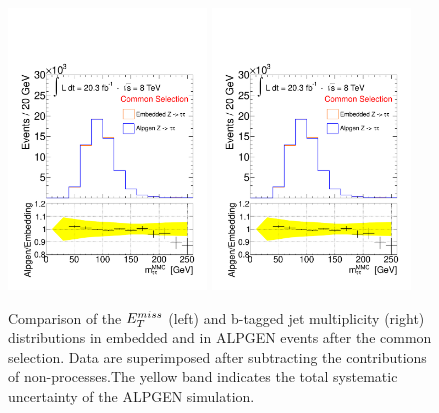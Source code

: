 \begin{figure}[tp]
     \begin{center}

           \includegraphics[page=2, width=0.47\textwidth]{figure/emb_plots.pdf}
            \includegraphics[page=3, width=0.47\textwidth]{figure/emb_plots.pdf}

    \end{center}
    \caption{Comparison of the  $E_{T}^{miss}$ (left)  and  b-tagged jet multiplicity (right) distributions in
	embedded and in ALPGEN \Ztautau events after the  common selection.
	Data are superimposed after subtracting  the contributions of non-\Ztautau processes.The yellow band indicates
	 the total systematic uncertainty  of the ALPGEN simulation.}
   \label{fig:emb_vs_alp}
\end{figure}



